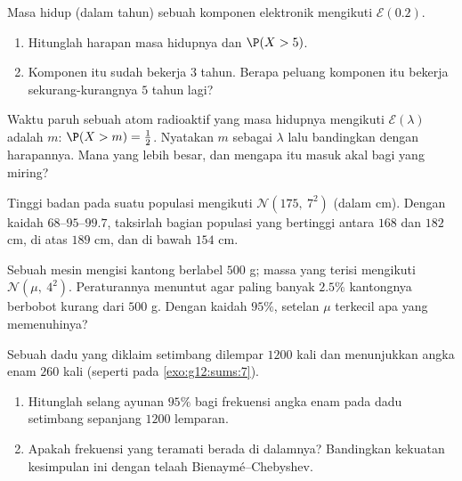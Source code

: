 \begin{exercise}[$\star$]\label{exo:g12:contdist:3}
Masa hidup (dalam tahun) sebuah komponen elektronik mengikuti
$\mathcal E(0.2)$.
\begin{enumerate}
  \item Hitunglah harapan masa hidupnya dan $\P(X > 5)$.
  \item Komponen itu sudah bekerja $3$ tahun. Berapa
        peluang komponen itu bekerja sekurang-kurangnya $5$ tahun lagi?
\end{enumerate}
\end{exercise}

\begin{exercise}[$\star\star$]\label{exo:g12:contdist:4}
Waktu paruh sebuah atom radioaktif yang masa hidupnya mengikuti
$\mathcal E(\lambda)$ adalah  $m$: $\P(X > m) = \frac12$. Nyatakan
$m$ sebagai  $\lambda$ lalu bandingkan dengan harapannya. Mana yang
lebih besar, dan mengapa itu masuk akal bagi  yang miring?
\end{exercise}

\begin{exercise}[$\star\star$]\label{exo:g12:contdist:5}
Tinggi badan pada suatu populasi mengikuti $\mathcal N(175,\ 7^2)$ (dalam cm). Dengan
kaidah $68$--$95$--$99.7$, taksirlah bagian populasi yang bertinggi
antara $168$ dan $182$ cm, di atas $189$ cm, dan di bawah $154$ cm.
\end{exercise}

\begin{exercise}[$\star\star$]\label{exo:g12:contdist:6}
Sebuah mesin mengisi kantong berlabel $500$ g; massa yang terisi mengikuti
$\mathcal N(\mu,\ 4^2)$. Peraturannya menuntut agar paling banyak $2.5\%$ kantongnya
berbobot kurang dari $500$ g. Dengan kaidah $95\%$, setelan $\mu$ terkecil apa
yang memenuhinya?
\end{exercise}

\begin{exercise}[$\star\star$]\label{exo:g12:contdist:7}
Sebuah dadu yang diklaim setimbang dilempar $1200$ kali dan menunjukkan angka enam $260$
kali (seperti pada \cref{exo:g12:sums:7}).
\begin{enumerate}
  \item Hitunglah selang ayunan $95\%$ bagi frekuensi angka enam
        pada dadu setimbang sepanjang $1200$ lemparan.
  \item Apakah frekuensi yang teramati berada di dalamnya? Bandingkan kekuatan
        kesimpulan ini dengan telaah Bienaymé--Chebyshev.
\end{enumerate}
\end{exercise}

